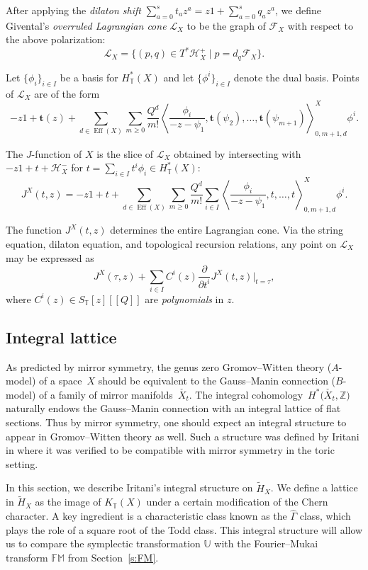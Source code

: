 \documentclass[pdftex]{sigma}
\numberwithin{equation}{section}
\newcommand{\cc}[1]{\mathcal{#1}} %
\newcommand{\ZZ}{\mathbb{Z}}
\newcommand{\bt}{{\bm{t}}}
\newcommand{\torus}{\mathbb{T}}
\newcommand{\FM}{\mathbb{FM}}
\DeclareMathOperator{\eff}{Eff}
\newcommand{\br}[1]{\left\langle#1\right\rangle} %
\begin{document}
\begin{Definition}
After applying the \emph{dilaton shift} $\sum_{a=0}^s t_a z^a = z1 + \sum_{a=0}^s q_a z^a$, we define Givental's \emph{overruled Lagrangian cone} $\cc L_X$ to be the graph of $\cc F_X$ with respect to the above polarization:
\[
\cc L_X = \bigl\{ (p, q) \in T^*\cc H_X^+ \mid p = d_q \cc F_X\bigr\}.
\]
\end{Definition}
Let $\{\phi_i\}_{i \in I}$ be a basis for $H^*_\torus(X)$ and let $\{\phi^i\}_{i \in I}$ denote the dual basis.
Points of $\cc L_X$ are of the form
\[
-z 1 + \bt(z) + \sum_{d \in \eff(X)} \sum_{m \geq 0} \frac{Q^d}{m!} \br{\frac{\phi_i}{-z - \psi_1}, \bt(\psi_2), \dots, \bt(\psi_{m+1})}_{0, m+1, d}^X \phi^i.
\]
\begin{Definition}
The $J$-function of $X$ is the slice of $\cc L_X$ obtained by intersecting with $-z 1 + t + \cc H_X^-$ for $t = \sum_{i \in I} t^i \phi_i \in H^*_\torus(X)$:
\[
J^X(t, z) = -z 1 + t+ \sum_{d \in \eff(X)} \sum_{m \geq 0} \frac{Q^d}{m!} \sum_{i \in I}\br{\frac{\phi_i}{-z - \psi_1}, t, \dots, t}_{0, m+1, d}^X \phi^i.
\]

\end{Definition}
The function $J^X(t, z)$ determines the entire Lagrangian cone. Via the string equation, dilaton equation, and topological recursion relations, any point on $\cc L_X$ may be expressed as
\[
J^X(\tau , z) + \sum_{i \in I} C^i(z) \frac{\partial}{\partial{t^i}} J^X(t, z)|_{t=\tau},
\]
where $C^i(z) \in S_\torus[z][\![Q]\!]$ are \emph{polynomials} in $z$.


\subsection{Integral lattice}
As predicted by mirror symmetry, the genus zero Gromov--Witten theory ($A$-model) of a space~$X$ should be equivalent to the Gauss--Manin connection ($B$-model) of a family of mirror manifolds~$\check{X_t}$. The integral cohomology~$H^*\bigl(\check{X_t}, \ZZ\bigr)$ naturally endows the Gauss--Manin connection with an integral lattice of flat sections. Thus by mirror symmetry, one should expect an integral structure to appear in Gromov--Witten theory as well. Such a structure was defined by Iritani in \cite{IriInt} where it was verified to be compatible with mirror symmetry in the toric setting.

In this section, we describe Iritani's integral structure on $\tilde H_X$. We define a lattice in $\tilde H_X$ as the image of $K_\torus(X)$ under a certain modification of the Chern character. A key ingredient is a characteristic class known as the $\hat\Gamma$ class, which plays the role of a square root of the Todd class. This integral structure will allow us to compare the symplectic transformation $\mathbb{U}$ with the Fourier--Mukai transform $\FM$ from Section~\ref{s:FM}.
\end{document}
